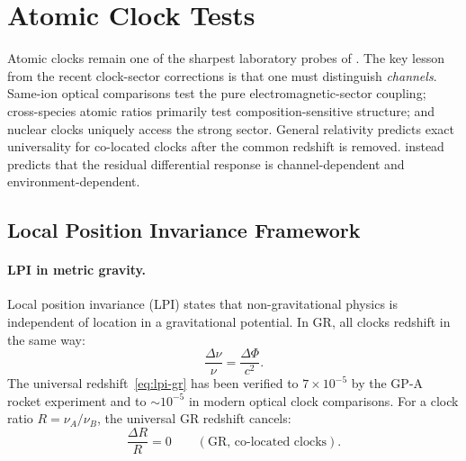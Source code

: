 
\section{Atomic Clock Tests}\label{sec:clocks}

Atomic clocks remain one of the sharpest laboratory probes of \DFD.  The key lesson from the recent clock-sector corrections is that one must distinguish \emph{channels}.  Same-ion optical comparisons test the pure electromagnetic-sector coupling; cross-species atomic ratios primarily test composition-sensitive structure; and nuclear clocks uniquely access the strong sector.  General relativity predicts exact universality for co-located clocks after the common redshift is removed.  \DFD instead predicts that the residual differential response is channel-dependent and environment-dependent.

\subsection{Local Position Invariance Framework}\label{sec:clocks-lpi}

\paragraph{LPI in metric gravity.}
Local position invariance (LPI) states that non-gravitational physics is independent of location in a gravitational potential.  In GR, all clocks redshift in the same way:
\begin{equation}\label{eq:lpi-gr}
\frac{\Delta\nu}{\nu}=\frac{\Delta\Phi}{c^2}.
\end{equation}
The universal redshift~\eqref{eq:lpi-gr} has been verified to $7 \times 10^{-5}$ by the GP-A rocket experiment and to ${\sim}10^{-5}$ in modern optical clock comparisons.
For a clock ratio $R=\nu_A/\nu_B$, the universal GR redshift cancels:
\begin{equation}\label{eq:lpi-differential}
\frac{\Delta R}{R}=0 \qquad (\text{GR, co-located clocks}).
\end{equation}

